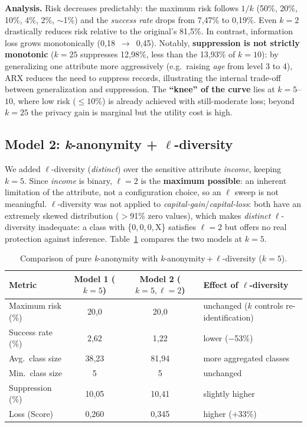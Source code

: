 \documentclass[10pt,a4paper]{article}
\begin{document}
\textbf{Analysis.} Risk decreases predictably: the maximum risk follows $1/k$ (50\%, 20\%, 10\%, 4\%, 2\%,
$\sim$1\%) and the \textit{success rate} drops from 7{,}47\% to 0{,}19\%. Even $k=2$ drastically reduces risk
relative to the original's 81{,}5\%. In contrast, information loss grows monotonically (0{,}18~$\to$~0{,}45).
Notably, \textbf{suppression is not strictly monotonic} ($k=25$ suppresses 12{,}98\%, less than the 13{,}93\% of
$k=10$): by generalizing one attribute more aggressively (e.g.\ raising \textit{age} from level 3 to 4), ARX
reduces the need to suppress records, illustrating the internal trade-off between generalization and
suppression. The \textbf{``knee'' of the curve} lies at $k=5$--$10$, where low risk ($\leq 10\%$) is already
achieved with still-moderate loss; beyond $k=25$ the privacy gain is marginal but the utility cost is high.

\subsection{Model 2: \textit{k}-anonymity + $\ell$-diversity}
We added $\ell$-diversity (\textit{distinct}) over the sensitive attribute \textit{income}, keeping $k=5$. Since
\textit{income} is binary, $\ell=2$ is the \textbf{maximum possible}: an inherent limitation of the
attribute, not a configuration choice, so an $\ell$ sweep is not meaningful. $\ell$-diversity was not applied to
\textit{capital-gain}/\textit{capital-loss}: both have an extremely skewed distribution ($>$91\% zero values),
which makes \textit{distinct} $\ell$-diversity inadequate: a class with \{0,\,0,\,0,\,X\} satisfies $\ell=2$
but offers no real protection against inference. Table~\ref{tab:m2} compares the two models at $k=5$.

\begin{table}[h]
\centering\footnotesize
\begin{tabular}{l c c l}
\toprule
\textbf{Metric} & \textbf{Model 1 ($k{=}5$)} & \textbf{Model 2 ($k{=}5,\ell{=}2$)} & \textbf{Effect of $\ell$-diversity} \\
\midrule
Maximum risk (\%)      & 20{,}0  & 20{,}0  & unchanged ($k$ controls re-identification) \\
Success rate (\%)      & 2{,}62  & 1{,}22  & lower ($-$53\%) \\
Avg.\ class size       & 38{,}23 & 81{,}94 & more aggregated classes \\
Min.\ class size       & 5       & 5       & unchanged \\
Suppression (\%)       & 10{,}05 & 10{,}41 & slightly higher \\
Loss (Score)           & 0{,}260 & 0{,}345 & higher ($+$33\%) \\
\bottomrule
\end{tabular}
\caption{Comparison of pure \textit{k}-anonymity with \textit{k}-anonymity\,+\,$\ell$-diversity ($k=5$).}
\label{tab:m2}
\end{table}
\end{document}
